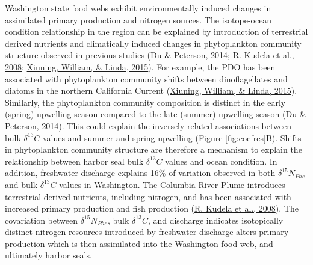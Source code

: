 \documentclass [11pt, proquest] {uwthesis}[2015/03/03]
\begin{document}
Washington state food webs exhibit environmentally induced changes in assimilated primary production and nitrogen sources. The isotope-ocean condition relationship in the region can be explained by introduction of terrestrial derived nutrients and climatically induced changes in phytoplankton community structure observed in previous studies (\protect\hyperlink{ref-Du2014}{Du \& Peterson, 2014}; \protect\hyperlink{ref-Kudela2008}{R. Kudela et al., 2008}; \protect\hyperlink{ref-Du2015}{Xiuning, William, \& Linda, 2015}). For example, the PDO has been associated with phytoplankton community shifts between dinoflagellates and diatoms in the northern California Current (\protect\hyperlink{ref-Du2015}{Xiuning, William, \& Linda, 2015}). Similarly, the phytoplankton community composition is distinct in the early (spring) upwelling season compared to the late (summer) upwelling season (\protect\hyperlink{ref-Du2014}{Du \& Peterson, 2014}). This could explain the inversely related associations between bulk \(\delta^{13}C\) values and summer and spring upwelling (Figure \ref{fig:coefres}B). Shifts in phytoplankton community structure are therefore a mechanism to explain the relationship between harbor seal bulk \(\delta^{13}C\) values and ocean condition. In addition, freshwater discharge explains 16\% of variation observed in both \(\delta^{15}N_{Phe}\) and bulk \(\delta^{13}C\) values in Washington. The Columbia River Plume introduces terrestrial derived nutrients, including nitrogen, and has been associated with increased primary production and fish production (\protect\hyperlink{ref-Kudela2008}{R. Kudela et al., 2008}). The covariation between \(\delta^{15}N_{Phe}\), bulk \(\delta^{13}C\), and discharge indicates isotopically distinct nitrogen resources introduced by freshwater discharge alters primary production which is then assimilated into the Washington food web, and ultimately harbor seals.
\end{document}

